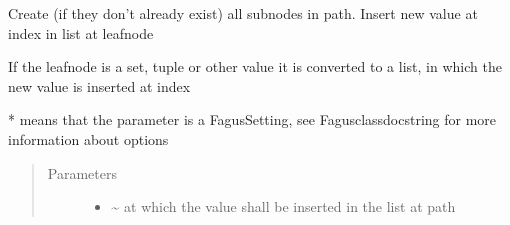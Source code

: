 \documentclass[a4paper,10pt,english]{sphinxmanual}
\begin{document}
\begin{fulllineitems}
\begin{fulllineitems}
\label{\detokenize{fagus.fagus:fagus.fagus.Fagus.insert}}
\pysigstartsignatures
{}
\pysigstopsignatures
\sphinxAtStartPar
Create (if they don’t already exist) all sub\sphinxhyphen{}nodes in path. Insert new value at index in list at leaf\sphinxhyphen{}node

\sphinxAtStartPar
If the leaf\sphinxhyphen{}node is a set, tuple or other value it is converted to a list, in which the new value is inserted at
index

\sphinxAtStartPar
* means that the parameter is a Fagus\sphinxhyphen{}Setting, see Fagus\sphinxhyphen{}class\sphinxhyphen{}docstring for more information about options
\begin{quote}\begin{description}
\item[{Parameters}] \leavevmode\begin{itemize}
\item {}
\sphinxAtStartPar
{} \textendash{} \textasciitilde{} at which the value shall be inserted in the list at path


\end{itemize}
\end{description}
\end{quote}
\end{fulllineitems}
\end{fulllineitems}
\end{document}

